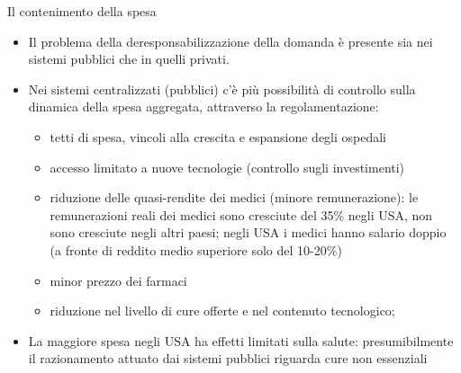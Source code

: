 \documentclass[aspectratio=149,11pt]{beamer}
\begin{document}
\begin{frame}{Il contenimento della spesa}
\begin{itemize}
\item Il problema della deresponsabilizzazione della domanda è presente
sia nei sistemi pubblici che in quelli privati.
\item Nei sistemi centralizzati (pubblici) c'è più possibilità di controllo sulla
dinamica della spesa aggregata, attraverso la regolamentazione:
\begin{itemize}
\item tetti di spesa, vincoli alla crescita e espansione degli ospedali
\item accesso limitato a nuove tecnologie (controllo sugli investimenti)
\item riduzione delle quasi-rendite dei medici (minore remunerazione):
le remunerazioni reali dei medici sono cresciute del 35\% negli USA,
non sono cresciute negli altri paesi; negli USA i medici hanno
salario doppio (a fronte di reddito medio superiore solo del 10-20\%)
\item minor prezzo dei farmaci
\item riduzione nel livello di cure offerte e nel contenuto
tecnologico;
\end{itemize}
\item La maggiore spesa negli USA ha effetti limitati sulla salute:
presumibilmente il razionamento attuato dai sistemi pubblici riguarda cure
non essenziali
\end{itemize}
\end{frame}
\end{document}
